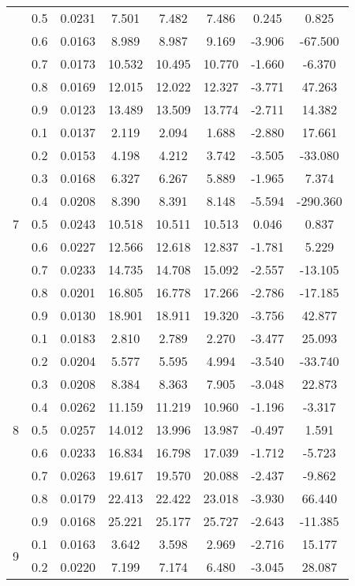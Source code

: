 \documentclass[11pt,a4paper]{report}
\begin{document}
\begin{longtable}{ | c | c || c | c | c | c | c | c | }
 & 0.5 & 0.0231 & 7.501 & 7.482 & 7.486 & 0.245 & 0.825 \\
 & 0.6 & 0.0163 & 8.989 & 8.987 & 9.169 & -3.906 & -67.500 \\
 & 0.7 & 0.0173 & 10.532 & 10.495 & 10.770 & -1.660 & -6.370 \\
 & 0.8 & 0.0169 & 12.015 & 12.022 & 12.327 & -3.771 & 47.263 \\
 & 0.9 & 0.0123 & 13.489 & 13.509 & 13.774 & -2.711 & 14.382 \\
 \hline
\multirow{9}{*}{7} & 0.1 & 0.0137 & 2.119 & 2.094 & 1.688 & -2.880 & 17.661 \\
 & 0.2 & 0.0153 & 4.198 & 4.212 & 3.742 & -3.505 & -33.080 \\
 & 0.3 & 0.0168 & 6.327 & 6.267 & 5.889 & -1.965 & 7.374 \\
 & 0.4 & 0.0208 & 8.390 & 8.391 & 8.148 & -5.594 & -290.360 \\
 & 0.5 & 0.0243 & 10.518 & 10.511 & 10.513 & 0.046 & 0.837 \\
 & 0.6 & 0.0227 & 12.566 & 12.618 & 12.837 & -1.781 & 5.229 \\
 & 0.7 & 0.0233 & 14.735 & 14.708 & 15.092 & -2.557 & -13.105 \\
 & 0.8 & 0.0201 & 16.805 & 16.778 & 17.266 & -2.786 & -17.185 \\
 & 0.9 & 0.0130 & 18.901 & 18.911 & 19.320 & -3.756 & 42.877 \\
 \hline
\multirow{9}{*}{8} & 0.1 & 0.0183 & 2.810 & 2.789 & 2.270 & -3.477 & 25.093 \\
 & 0.2 & 0.0204 & 5.577 & 5.595 & 4.994 & -3.540 & -33.740 \\
 & 0.3 & 0.0208 & 8.384 & 8.363 & 7.905 & -3.048 & 22.873 \\
 & 0.4 & 0.0262 & 11.159 & 11.219 & 10.960 & -1.196 & -3.317 \\
 & 0.5 & 0.0257 & 14.012 & 13.996 & 13.987 & -0.497 & 1.591 \\
 & 0.6 & 0.0233 & 16.834 & 16.798 & 17.039 & -1.712 & -5.723 \\
 & 0.7 & 0.0263 & 19.617 & 19.570 & 20.088 & -2.437 & -9.862 \\
 & 0.8 & 0.0179 & 22.413 & 22.422 & 23.018 & -3.930 & 66.440 \\
 & 0.9 & 0.0168 & 25.221 & 25.177 & 25.727 & -2.643 & -11.385 \\
 \hline
\multirow{9}{*}{9} & 0.1 & 0.0163 & 3.642 & 3.598 & 2.969 & -2.716 & 15.177 \\
 & 0.2 & 0.0220 & 7.199 & 7.174 & 6.480 & -3.045 & 28.087 \\

\end{longtable}
\end{document}
